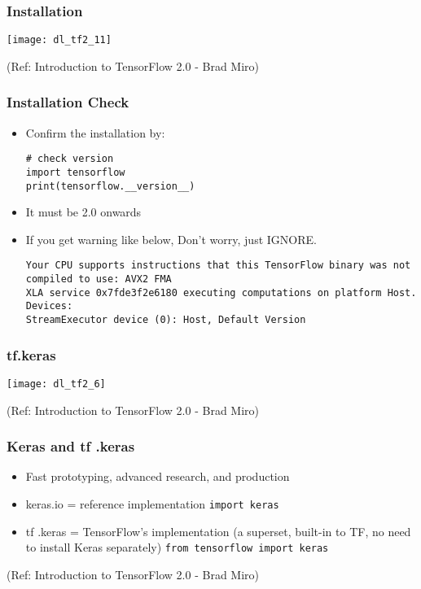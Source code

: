 \begin{frame}[fragile] \frametitle{Installation}

\begin{center}
\texttt{[image: dl\_tf2\_11]}
\end{center}


\tiny{(Ref: Introduction to TensorFlow 2.0 - Brad Miro)}
\end{frame}

\begin{frame}[fragile] \frametitle{Installation Check}

\begin{itemize}
\item Confirm the installation by:
\begin{lstlisting}
# check version
import tensorflow
print(tensorflow.__version__)
\end{lstlisting}
\item It must be 2.0 onwards
\item If you get warning like below, Don't worry, just IGNORE.
\begin{lstlisting}
Your CPU supports instructions that this TensorFlow binary was not compiled to use: AVX2 FMA
XLA service 0x7fde3f2e6180 executing computations on platform Host. Devices:
StreamExecutor device (0): Host, Default Version
\end{lstlisting}

\end{itemize}

\end{frame}


\begin{frame}[fragile] \frametitle{tf.keras}

\begin{center}
\texttt{[image: dl\_tf2\_6]}
\end{center}


\tiny{(Ref: Introduction to TensorFlow 2.0 - Brad Miro)}
\end{frame}

\begin{frame}[fragile] \frametitle{Keras and tf .keras}

\begin{itemize}
\item  Fast prototyping, advanced research, and production
\item keras.io = reference implementation \lstinline|import keras|
\item tf .keras  = TensorFlow’s implementation (a superset, built-in to TF, no need to install Keras separately) \lstinline|from tensorflow import keras|
\end{itemize}
\tiny{(Ref: Introduction to TensorFlow 2.0 - Brad Miro)}
\end{frame}

